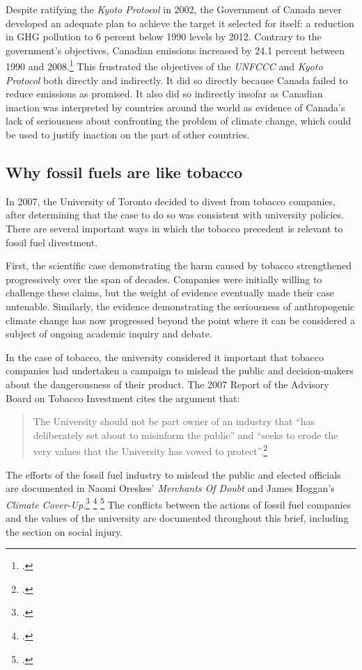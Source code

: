Despite ratifying the \emph{Kyoto Protocol} in 2002, the Government of Canada never developed an adequate plan to achieve the target it selected for itself: a reduction in GHG pollution to 6 percent below 1990 levels by 2012.
Contrary to the government's objectives, Canadian emissions increased by 24.1 percent between 1990 and 2008.\footcite[][p. 3]{UNFCCCCanada2010}
This frustrated the objectives of the \emph{UNFCCC} and \emph{Kyoto Protocol} both directly and indirectly.
It did so directly because Canada failed to reduce emissions as promised.
It also did so indirectly insofar as Canadian inaction was interpreted by countries around the world as evidence of Canada's lack of seriousness about confronting the problem of climate change, which could be used to justify inaction on the part of other countries. 



	\subsection{Why fossil fuels are like tobacco}
	\label{sec:LikeTobacco}



In 2007, the University of Toronto decided to divest from tobacco companies, after determining that the case to do so was consistent with university policies.
There are several important ways in which the tobacco precedent is relevant to fossil fuel divestment.



First, the scientific case demonstrating the harm caused by tobacco strengthened progressively over the span of decades.
Companies were initially willing to challenge these claims, but the weight of evidence eventually made their case untenable.
Similarly, the evidence demonstrating the seriousness of anthropogenic climate change has now progressed beyond the point where it can be considered a subject of ongoing academic inquiry and debate.



In the case of tobacco, the university considered it important that tobacco companies had undertaken a campaign to mislead the public and decision-makers about the dangerousness of their product.
The 2007 Report of the Advisory Board on Tobacco Investment cites the argument that:
\begin{quote}
The University should not be part owner of an industry that ``has deliberately set about to misinform the public'' and ``seeks to erode the very values that the University has vowed to protect''.\footcite[][p. 5]{TobaccoReport_2007}
\end{quote}
The efforts of the fossil fuel industry to mislead the public and elected officials are documented in Naomi Oreskes' \emph{Merchants Of Doubt} and James Hoggan's \emph{Climate Cover-Up}.\footcite[][]{MerchantsDoubt} \footcite[][]{ClimateCoverUp} \footcite[See also: ][]{ExxonTobacco2007}
The conflicts between the actions of fossil fuel companies and the values of the university are documented throughout this brief, including the section on social injury.



